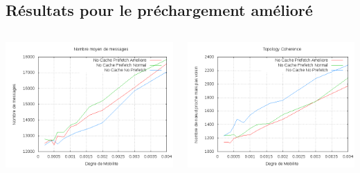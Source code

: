 \documentclass{beamer}
\begin{document}
  \subsection{Résultats pour le préchargement amélioré}
  \begin{frame}
	\begin{columns}
         \begin{column}{5cm}
          \includegraphics[scale=0.25]{./Ressources/Images/Courbes_Final_Rapport/Nombre_Messages_Prefetchs.png}\\
         \end{column}
         \begin{column}{5cm}
          \includegraphics[scale=0.25]{./Ressources/Images/Courbes_Final_Rapport/Topology_Coherence_Prefetchs.png}\\
         \end{column}
        \end{columns}
  \end{frame}
	
\end{document}
